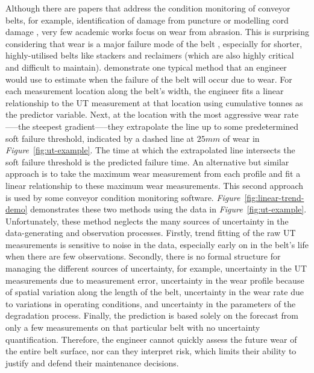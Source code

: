 Although there are papers that address the condition monitoring of conveyor belts, for example, identification of damage from puncture or modelling cord damage \citep{bortnowski_2022}, very few academic works focus on wear from abrasion. This is surprising considering that wear is a major failure mode of the belt \citep{bortnowski_2022}, especially for shorter, highly-utilised belts like stackers and reclaimers (which are also highly critical and difficult to maintain). \citet{webb_2020} demonstrate one typical method that an engineer would use to estimate when the failure of the belt will occur due to wear. For each measurement location along the belt's width, the engineer fits a linear relationship to the UT measurement at that location using cumulative tonnes as the predictor variable. Next, at the location with the most aggressive wear rate—--the steepest gradient—--they extrapolate the line up to some predetermined soft failure threshold, indicated by a dashed line at $25mm$ of wear in \textit{Figure}~\ref{fig:ut-example}. The time at which the extrapolated line intersects the soft failure threshold is the predicted failure time. An alternative but similar approach is to take the maximum wear measurement from each profile and fit a linear relationship to these maximum wear measurements. This second approach is used by some conveyor condition monitoring software. \textit{Figure}~\ref{fig:linear-trend-demo} demonstrates these two methods using the data in \textit{Figure}~\ref{fig:ut-example}. Unfortunately, these method neglects the many sources of uncertainty in the data-generating and observation processes. Firstly, trend fitting of the raw UT measurements is sensitive to noise in the data, especially early on in the belt's life when there are few observations. Secondly, there is no formal structure for managing the different sources of uncertainty, for example, uncertainty in the UT measurements due to measurement error, uncertainty in the wear profile because of spatial variation along the length of the belt, uncertainty in the wear rate due to variations in operating conditions, and uncertainty in the parameters of the degradation process. Finally, the prediction is based solely on the forecast from only a few measurements on that particular belt with no uncertainty quantification. Therefore, the engineer cannot quickly assess the future wear of the entire belt surface, nor can they interpret risk, which limits their ability to justify and defend their maintenance decisions.

